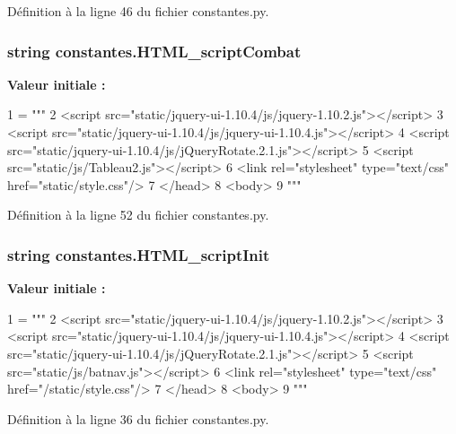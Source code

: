 Définition à la ligne 46 du fichier constantes.\-py.

\hypertarget{namespaceconstantes_a98851e65f9b7b6f42bd22f328e548889}{
\subsubsection[{H\-T\-M\-L\-\_\-script\-Combat}]{\setlength{\rightskip}{0pt plus 5cm}string constantes.\-H\-T\-M\-L\-\_\-script\-Combat}}\label{namespaceconstantes_a98851e65f9b7b6f42bd22f328e548889}
{\bfseries Valeur initiale \-:}
\begin{DoxyCode}
1 = \textcolor{stringliteral}{"""}
2 \textcolor{stringliteral}{<script src="static/jquery-ui-1.10.4/js/jquery-1.10.2.js"></script>}
3 \textcolor{stringliteral}{<script src="static/jquery-ui-1.10.4/js/jquery-ui-1.10.4.js"></script>}
4 \textcolor{stringliteral}{<script src="static/jquery-ui-1.10.4/js/jQueryRotate.2.1.js"></script>}
5 \textcolor{stringliteral}{<script src="static/js/Tableau2.js"></script>}
6 \textcolor{stringliteral}{<link rel="stylesheet" type="text/css" href="static/style.css"/>}
7 \textcolor{stringliteral}{</head>}
8 \textcolor{stringliteral}{<body>}
9 \textcolor{stringliteral}{"""}
\end{DoxyCode}


Définition à la ligne 52 du fichier constantes.\-py.

\hypertarget{namespaceconstantes_aa2fb1d8038db179e532f06a5e7bb578b}{
\subsubsection[{H\-T\-M\-L\-\_\-script\-Init}]{\setlength{\rightskip}{0pt plus 5cm}string constantes.\-H\-T\-M\-L\-\_\-script\-Init}}\label{namespaceconstantes_aa2fb1d8038db179e532f06a5e7bb578b}
{\bfseries Valeur initiale \-:}
\begin{DoxyCode}
1 = \textcolor{stringliteral}{"""}
2 \textcolor{stringliteral}{<script src="static/jquery-ui-1.10.4/js/jquery-1.10.2.js"></script>}
3 \textcolor{stringliteral}{<script src="static/jquery-ui-1.10.4/js/jquery-ui-1.10.4.js"></script>}
4 \textcolor{stringliteral}{<script src="static/jquery-ui-1.10.4/js/jQueryRotate.2.1.js"></script>}
5 \textcolor{stringliteral}{<script src="static/js/batnav.js"></script>}
6 \textcolor{stringliteral}{<link rel="stylesheet" type="text/css" href="/static/style.css"/>}
7 \textcolor{stringliteral}{</head>}
8 \textcolor{stringliteral}{<body>}
9 \textcolor{stringliteral}{"""}
\end{DoxyCode}


Définition à la ligne 36 du fichier constantes.\-py.

